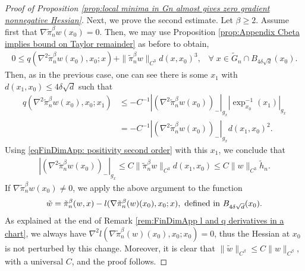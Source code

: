 \documentclass[11pt,reqno]{amsart}
\numberwithin{equation}{section}
\theoremstyle{plain}
\begin{document}
\begin{proof}[Proof of Proposition \ref{prop:local minima in Gn almost gives zero gradient nonnegative Hessian}]
  Next, we prove the second estimate. Let $\beta\geq 2$. Assume first that $\nabla \tilde \pi_n^\beta w(x_0)=0$. Then, we may use Proposition \ref{prop:Appendix Cbeta implies bound on Taylor remainder} as before to obtain,
  \begin{align}\label{eqFinDimApp: positivity second order}
    0\leq q(\nabla^2 \tilde \pi_n^\beta w(x_0),x_0;x)+\|\tilde \pi_n^\beta w\|_{C^3}d(x,x_0)^3,\;\;\;\forall\;x\in \tilde G_n \cap B_{4\delta \sqrt{d}}(x_0).
  \end{align}
  Then, as in the previous case, one can see there is some $x_1$ with $d(x_1,x_0)\leq  4\delta \sqrt{d}$ such that
  \begin{align*}
    q(\nabla^2 \tilde \pi_n^\beta w(x_0),x_0;x_1) & \leq -C^{-1}|(\nabla^2 \tilde \pi_n^\beta w(x_0))_-|_{g_x}|\exp_{x_0}^{-1}(x_1)|_{g_x}\\
	& = -C^{-1}|(\nabla^2 \tilde \pi_n^\beta w(x_0))_-|_{g_x}d(x_1,x_0)^2.
  \end{align*}
  Using \eqref{eqFinDimApp: positivity second order} with this $x_1$, we conclude that
  \begin{align*}
    |(\nabla^2 \tilde \pi_n^\beta w(x_0))_-|_{g_x}\leq C\|\tilde \pi_n^\beta w\|_{C^3}d(x_1,x_0) \leq C\|w\|_{C^3}\tilde h_n.
  \end{align*}
  If $\nabla \tilde \pi_n^\beta w(x_0) \neq 0$, we apply the above argument to the function
  \begin{align*}
    \tilde w = \tilde \pi_n^\beta(w,x)-l( \nabla \tilde \pi_n^\beta(w)(x_0),x_0;x), \textnormal{ defined in } B_{4\delta \sqrt{d}}(x_0).
  \end{align*}
  As explained at the end of Remark \ref{rem:FinDimApp l and q derivatives in a chart}, we always have $\nabla^2l( \nabla \tilde \pi_n^\beta(w)(x_0),x_0;x_0)=0$, thus the Hessian at $x_0$ is not perturbed by this change. Moreover, it is clear that $\|\tilde w\|_{C^\beta} \leq C\|w\|_{C^\beta}$, with a universal $C$, and the proof follows.
\end{proof}
\end{document}
